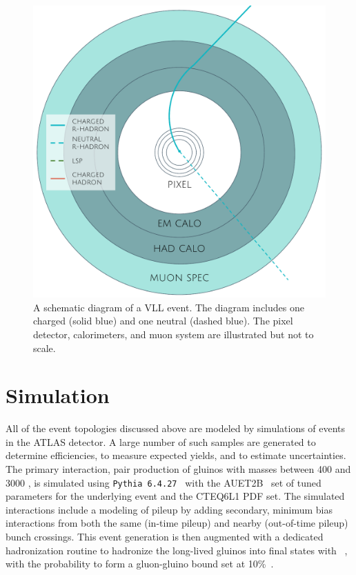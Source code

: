 \begin{figure}[tb]
\centering
\includegraphics[width=\fullfig]{figures/rhadron_stable.pdf}
\caption{A schematic diagram of a \acs*{VLL} \rhadron event. The diagram includes one charged \rhadron (solid blue) and one neutral \rhadron (dashed blue). The pixel detector, calorimeters, and muon system are illustrated but not to scale.}
\label{fig:rhadron_stable}
\end{figure}



\section{Simulation}
\label{sec:simulation_samples}

All of the event topologies discussed above are modeled by simulations of \rhadron events in the ATLAS detector. 
A large number of such samples are generated to determine efficiencies, to measure expected yields, and to estimate uncertainties. 
The primary interaction, pair production of gluinos with masses between 400 and 3000 \GeV, is simulated using \texttt{Pythia 6.4.27}~\cite{pythia6}  with the AUET2B~\cite{ATL-PHYS-PUB-2011-014} set of tuned parameters for the underlying event and the CTEQ6L1 \cite{CTEQ} \ac{PDF} set.
The simulated interactions include a modeling of pileup by adding secondary, minimum bias interactions from both the same (in-time pileup) and nearby (out-of-time pileup) bunch crossings.
This event generation is then augmented with a dedicated hadronization routine to hadronize the long-lived gluinos into final states with \rhadrons~\cite{heavy_hadronization}, with the probability to form a gluon-gluino bound set at 10\%~\cite{Fairbairn:2006gg}.

